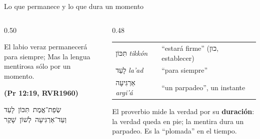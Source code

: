 \documentclass[hyperref={bookmarks=false},aspectratio=169]{beamer}
\newcommand{\heb}[1]{\mbox{\foreignlanguage{hebrew}{#1}}}
\newcommand{\fuente}[1]{\par\hfill{\upshape\bfseries\footnotesize\textcolor{azul}{#1}}}
\newcommand{\destacar}[1]{\textbf{\textcolor{azul}{#1}}}
\begin{document}
\begin{frame}{Lo que permanece y lo que dura un momento}
\begin{columns}[c,onlytextwidth]
\begin{column}{0.50\textwidth}
\begin{cita}El labio veraz permanecerá para siempre; Mas la lengua mentirosa sólo por un momento.\fuente{(Pr 12:19, RVR1960)}\end{cita}
\begin{center}\heb{שְׂפַת־אֱמֶת תִּכּוֹן לָעַד}\\ \heb{וְעַד־אַרְגִּיעָה לְשׁוֹן שָׁקֶר}\end{center}
\end{column}
\begin{column}{0.48\textwidth}
\scriptsize\renewcommand{\arraystretch}{1.15}
\begin{tabular}{@{}>{\RaggedRight\arraybackslash}p{1.9cm}>{\RaggedRight\arraybackslash}p{3.3cm}@{}}
\toprule
\heb{תִּכּוֹן} \emph{tikkón} & ``estará firme'' (\heb{כון}, establecer) \\
\heb{לָעַד} \emph{la'ad} & ``para siempre'' \\
\heb{אַרְגִּיעָה} \emph{argi'á} & ``un parpadeo'', un instante \\
\bottomrule
\end{tabular}\par\medskip
\small El proverbio mide la verdad por su \destacar{duración}: la verdad queda en pie; la mentira dura un parpadeo. Es la ``plomada'' en el tiempo.
\end{column}
\end{columns}
\end{frame}
\end{document}
